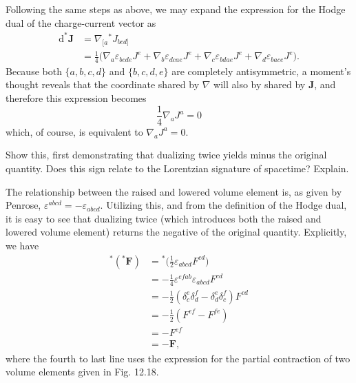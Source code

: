\documentclass[../road-to-reality.tex]{subfiles}
\begin{document}
\begin{questions}
  \begin{solution}
    Following the same steps as above, we may expand the expression for the
    Hodge dual of the charge-current vector as
    \begin{align*}
      \mathrm{d}^*\mathbf{J} &= \nabla_{[a}{}^*J_{bcd]} \\
                             &= \frac{1}{4}\Big(\nabla_{a}\varepsilon_{bcde}J^e +
                               \nabla_{b}\varepsilon_{dcae}J^e + \nabla_{c}\varepsilon_{bdae}J^e + \nabla_d\varepsilon_{bace}J^e\Big).
    \end{align*}
    Because both $\{a,b,c,d\}$ and $\{b,c,d,e\}$ are completely antisymmetric,
    a moment's thought reveals that the coordinate shared by $\nabla$ will
    also by shared by $\mathbf{J}$, and therefore this expression becomes
    \[
      \frac{1}{4}\nabla_aJ^a = 0
    \]
    which, of course, is equivalent to $\nabla_aJ^a = 0$.
  \end{solution}

\question Show this, first demonstrating that dualizing twice yields minus the original quantity. Does this sign relate to the Lorentzian signature of spacetime? Explain.

  \begin{solution}
    The relationship between the raised and lowered volume element is, as given
    by Penrose, $\varepsilon^{abcd}=-\varepsilon_{abcd}$. Utilizing this, and from the
    definition of the Hodge dual, it is easy to see that dualizing twice (which
    introduces both the raised and lowered volume element) returns the negative
    of the original quantity. Explicitly, we have 
    \begin{align*}
      {}^*({}^*\mathbf{F}) &= {}^*\Big(\frac{1}{2}\varepsilon_{abcd}F^{cd}\Big) \\
                           &= -\frac{1}{4}\varepsilon^{efab}\varepsilon_{abcd}F^{cd} \\
                           &= -\frac{1}{2}(\delta^e_c\delta^f_d - \delta^e_d\delta^f_c)F^{cd} \\
                           &= -\frac{1}{2}(F^{ef} - F^{fe}) \\
                           &= -F^{ef} \\
                           &= -\mathbf{F},
    \end{align*}
    where the fourth to last line uses the expression for the partial
    contraction of two volume elements given in Fig. 12.18.


\end{solution}
\end{questions}
\end{document}
